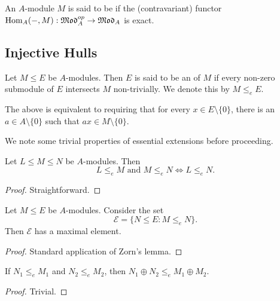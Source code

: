 \begin{definition}
    An $A$-module $M$ is said to be  if the (contravariant) functor $\operatorname{Hom}_A(-,M):\mathfrak{Mod}_A^{op}\to\mathfrak{Mod}_A$ is exact.
\end{definition}

\subsection{Injective Hulls}

\begin{definition}
    Let $M\le E$ be $A$-modules. Then $E$ is said to be an  of $M$ if every non-zero submodule of $E$ intersects $M$ non-trivially. We denote this by $M\le_e E$.
\end{definition}
\begin{remark}
    The above is equivalent to requiring that for every $x\in E\setminus\{0\}$, there is an $a\in A\setminus\{0\}$ such that $ax\in M\setminus\{0\}$.
\end{remark}

We note some trivial properties of essential extensions before proceeding.

\begin{proposition}
    Let $L\le M\le N$ be $A$-modules. Then 
    \begin{equation*}
        L\le_e M\text{ and } M\le_e N\iff L\le_e N.
    \end{equation*}
\end{proposition}
\begin{proof}
    Straightforward.
\end{proof}

\begin{proposition}
    Let $M\le E$ be $A$-modules. Consider the set 
    \begin{equation*}
        \mathcal E = \{N\le E\colon M\le_e N\}.
    \end{equation*}
    Then $\mathcal E$ has a maximal element.
\end{proposition}
\begin{proof}
    Standard application of Zorn's lemma.
\end{proof}

\begin{proposition}
    If $N_1\le_e M_1$ and $N_2\le_e M_2$, then $N_1\oplus N_2\le_e M_1\oplus M_2$.
\end{proposition}
\begin{proof}
    Trivial.
\end{proof}

